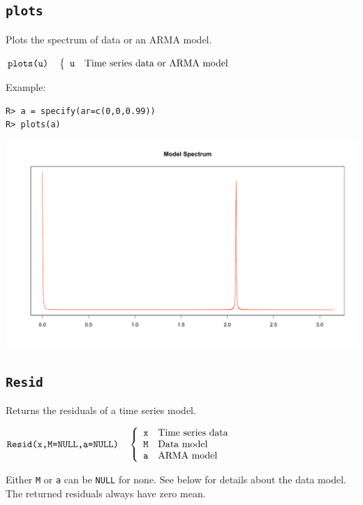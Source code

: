 \documentclass[12pt]{article}
\begin{document}
\subsection{\tt plots}
Plots the spectrum of data or an ARMA model.

\bigskip
$
\hbox{\tt plots(u)}\quad\left\{\begin{array}{ll}
{\tt u} & \hbox{Time series data or ARMA model}
\end{array}\right.
$

\bigskip
\noindent
Example:

\begin{verbatim}
R> a = specify(ar=c(0,0,0.99))
R> plots(a)
\end{verbatim}

\begin{center}
\includegraphics[scale=0.3]{Rplot-23.pdf}
\end{center}

\newpage

\subsection{\tt Resid}
Returns the residuals of a time series model.

\bigskip
$
\hbox{\tt Resid(x,M=NULL,a=NULL)}\quad\left\{\begin{array}{ll}
{\tt x} & \hbox{Time series data}\\
{\tt M} & \hbox{Data model}\\
{\tt a} & \hbox{ARMA model}
\end{array}\right.
$

\bigskip
\noindent
Either {\tt M} or {\tt a} can be {\tt NULL} for none.
See below for details about the data model.
The returned residuals always have zero mean.
\end{document}
